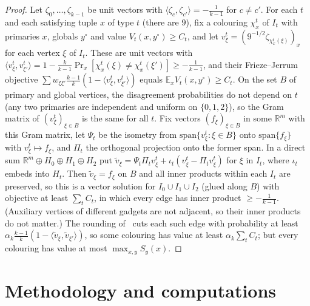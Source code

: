 \documentclass[11pt,letterpaper]{article}
\theoremstyle{remark}
\newcommand{\R}{\mathbb{R}}
\newcommand{\yc}{y^{\circ}}
\begin{document}
\begin{proof}
Let
$\zeta_0,\dots,\zeta_{k-1}$ be unit vectors with $\langle \zeta_c,\zeta_{c'}\rangle=-\frac1{k-1}$ for
$c\ne c'$. For each $t$ and each satisfying tuple $x$ of type $t$ (there are $9$), fix a colouring
$\chi^t_x$ of $I_t$ with primaries $x$, globals $\yc$ and value $V_t(x,\yc)\ge C_t$, and let
$v^t_\xi=(9^{-1/2}\zeta_{\chi^t_x(\xi)})_x$ for each vertex $\xi$ of $I_t$. These are unit vectors with
$\langle v^t_\xi,v^t_{\xi'}\rangle=1-\frac{k}{k-1}\Pr_x[\chi^t_x(\xi)\ne\chi^t_x(\xi')]\ge-\frac1{k-1}$, and their
Frieze--Jerrum objective $\sum w_{\xi\xi'}\frac{k-1}{k}(1-\langle v^t_\xi,v^t_{\xi'}\rangle)$ equals
$\mathbb E_xV_t(x,\yc)\ge C_t$. On the set $B$ of primary and global vertices, the disagreement
probabilities do not depend on $t$ (any two primaries are independent and uniform on $\{0,1,2\}$), so the
Gram matrix of $(v^t_\xi)_{\xi\in B}$ is the same for all $t$. Fix vectors $(f_\xi)_{\xi\in B}$ in some $\R^m$ with this Gram
matrix, let $\Psi_t$ be the isometry from $\mathrm{span}\{v^t_\xi:\xi\in B\}$ onto $\mathrm{span}\{f_\xi\}$ with
$v^t_\xi\mapsto f_\xi$, and $\Pi_t$ the orthogonal projection onto the former span. In a direct sum
$\R^m\oplus H_0\oplus H_1\oplus H_2$ put $\tilde v_\xi=\Psi_t\Pi_tv^t_\xi+\iota_t(v^t_\xi-\Pi_tv^t_\xi)$ for $\xi$ in $I_t$,
where $\iota_t$ embeds into $H_t$. Then $\tilde v_\xi=f_\xi$ on $B$ and all inner products within each $I_t$ are
preserved, so this is a vector solution for $I_0\cup I_1\cup I_2$ (glued along $B$) with objective at least
$\sum_tC_t$, in which every edge has inner product $\ge-\frac1{k-1}$. (Auxiliary vertices of different
gadgets are not adjacent, so their inner products do not matter.) The rounding of~\cite{FJ97,dKPW04}
cuts each such edge with probability at least $\alpha_k\frac{k-1}{k}(1-\langle\tilde v_\xi,\tilde v_{\xi'}\rangle)$,
so some colouring has value at least $\alpha_k\sum_tC_t$; but every colouring has value at most
$\max_{x,y}S_y(x)$.
\end{proof}

\section{Methodology and computations}\label{app:comp}
\end{document}
